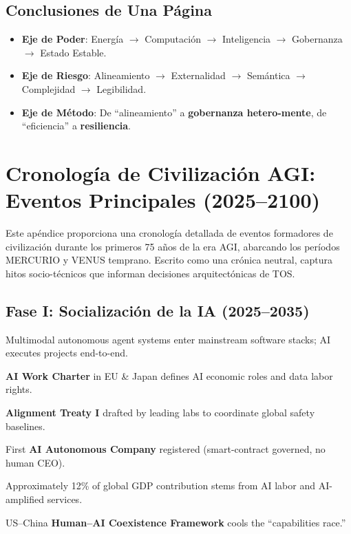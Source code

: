 \documentclass[11pt]{article}
\begin{document}
\subsection{Conclusiones de Una Página}
\begin{itemize}[noitemsep]
  \item \textbf{Eje de Poder}: Energía $\rightarrow$ Computación $\rightarrow$ Inteligencia $\rightarrow$ Gobernanza $\rightarrow$ Estado Estable.
  \item \textbf{Eje de Riesgo}: Alineamiento $\rightarrow$ Externalidad $\rightarrow$ Semántica $\rightarrow$ Complejidad $\rightarrow$ Legibilidad.
  \item \textbf{Eje de Método}: De ``alineamiento'' a \textbf{gobernanza hetero-mente}, de ``eficiencia'' a \textbf{resiliencia}.
\end{itemize}

\newpage

\section{Cronología de Civilización AGI: Eventos Principales (2025–2100)}
\label{appendix:timeline}

Este apéndice proporciona una cronología detallada de eventos formadores de civilización durante los primeros 75 años de la era AGI, abarcando los períodos MERCURIO y VENUS temprano. Escrito como una crónica neutral, captura hitos socio-técnicos que informan decisiones arquitectónicas de TOS.

\subsection{Fase I: Socialización de la IA (2025–2035)}
\begin{description}[style=nextline,leftmargin=2cm]
  \item[2026] Multimodal autonomous agent systems enter mainstream software stacks; AI executes projects end-to-end.
  \item[2028] \textbf{AI Work Charter} in EU \& Japan defines AI economic roles and data labor rights.
  \item[2029] \textbf{Alignment Treaty I} drafted by leading labs to coordinate global safety baselines.
  \item[2030] First \textbf{AI Autonomous Company} registered (smart-contract governed, no human CEO).
  \item[2032] Approximately 12\% of global GDP contribution stems from AI labor and AI-amplified services.
  \item[2034] US–China \textbf{Human–AI Coexistence Framework} cools the ``capabilities race.''
\end{description}
\end{document}
